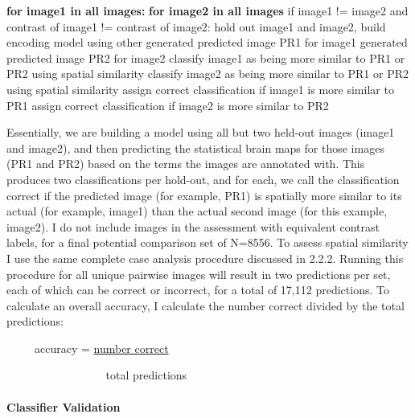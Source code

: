 \documentclass{report}
\begin{document}
\textbf{for image1 in all images:} \newline
\indent \indent \textbf{for image2 in all images} \newline
\indent \indent \indent if image1 != image2 and contrast of image1 != contrast of
image2:\newline
\indent \indent \indent \indent hold out image1 and image2, build encoding model using other \newline
\indent \indent \indent \indent generated predicted image PR1 for image1   \newline  
\indent \indent \indent \indent generated predicted image PR2 for image2   \newline  
\indent \indent \indent \indent classify image1 as being more similar to PR1 or PR2 using
spatial similarity \newline
\indent \indent \indent \indent classify image2 as being more similar to PR1 or PR2 using spatial similarity \newline
\indent \indent \indent \indent assign correct classification if image1 is more similar to
PR1 \newline
\indent \indent \indent \indent assign correct classification if image2 is more similar to
PR2 \newline

Essentially, we are building a model using all but two held-out images (image1 and image2), and then predicting the statistical brain maps for those images (PR1 and PR2) based on the terms the images are annotated with. This produces two classifications per hold-out, and for each, we call the classification correct if the predicted image (for example, PR1) is spatially more similar to its actual (for example, image1) than the actual second image (for this example, image2). I do not include images in the assessment with equivalent contrast
labels, for a final potential comparison set of N=8556. To assess
spatial similarity I use the same complete case analysis procedure
discussed in 2.2.2. Running this procedure for all unique pairwise
images will result in two predictions per set, each of which can be
correct or incorrect, for a total of 17,112 predictions. To calculate an
overall accuracy, I calculate the number correct divided by the total
predictions: \newline

~ ~ ~ accuracy = \underline{number correct}

 ~ ~ ~ ~ ~ ~ ~ ~ ~ ~  ~total predictions

\paragraph{Classifier Validation}
\end{document}
